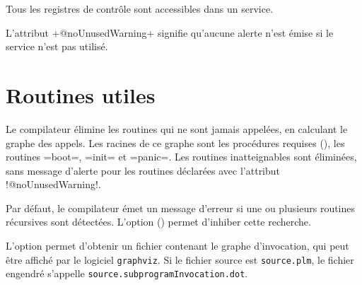 
Tous les registres de contrôle sont accessibles dans un service.








L'attribut \plm+@noUnusedWarning+ signifie qu'aucune alerte n'est émise si le service n'est pas utilisé.



































\section{Routines utiles}

Le compilateur élimine les routines qui ne sont jamais appelées, en calculant le graphe des appels. Les racines de ce graphe sont les procédures requises (), les routines \plm=boot=, \plm=init= et \plm=panic=. Les routines inatteignables sont éliminées, sans message d'alerte pour les routines déclarées avec l'attribut \plm!@noUnusedWarning!.












Par défaut, le compilateur émet un message d'erreur si une ou plusieurs routines récursives sont détectées. L'option  () permet d'inhiber cette recherche.

L'option  permet d'obtenir un fichier contenant le graphe d'invocation, qui peut être affiché par le logiciel \texttt{graphviz}. Si le fichier source est \texttt{source.plm}, le fichier engendré s'appelle \texttt{source.subprogramInvocation.dot}.

